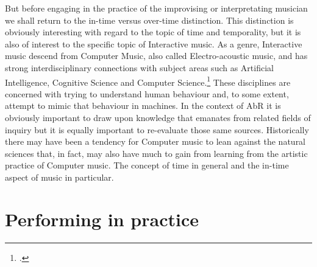 But before engaging in the practice of the improvising or interpretating musician we shall return to the in-time versus over-time distinction. This distinction is obviously interesting with regard to the topic of time and temporality, but it is also of interest to the specific topic of Interactive music. As a genre, Interactive music descend from Computer Music, also called Electro-acoustic music, and has strong interdisciplinary connections with subject areas such as Artificial Intelligence, Cognitive Science and Computer Science.\footcite[24]{moore90} These disciplines are concerned with trying to understand human behaviour and, to some extent, attempt to mimic that behaviour in machines. In the context of AbR it is obviously important to draw upon knowledge that emanates from related fields of inquiry but it is equally important to re-evaluate those same sources. Historically there may have been a tendency for Computer music to lean against the natural sciences that, in fact, may also have much to gain from learning from the artistic practice of Computer music. The concept of time in general and the in-time aspect of music in particular.


\section*{Performing in practice}
\label{sec:performing-practice}

